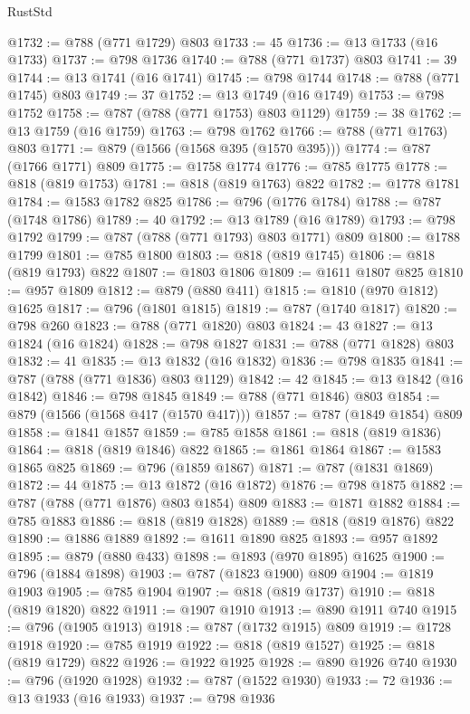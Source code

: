 \begin{lexlean}{RustStd}
\begin{coremodule}
@1732 := @788 (@771 @1729) @803
@1733 := 45
@1736 := @13 @1733 (@16 @1733)
@1737 := @798 @1736
@1740 := @788 (@771 @1737) @803
@1741 := 39
@1744 := @13 @1741 (@16 @1741)
@1745 := @798 @1744
@1748 := @788 (@771 @1745) @803
@1749 := 37
@1752 := @13 @1749 (@16 @1749)
@1753 := @798 @1752
@1758 := @787 (@788 (@771 @1753) @803 @1129)
@1759 := 38
@1762 := @13 @1759 (@16 @1759)
@1763 := @798 @1762
@1766 := @788 (@771 @1763) @803
@1771 := @879 (@1566 (@1568 @395 (@1570 @395)))
@1774 := @787 (@1766 @1771) @809
@1775 := @1758 @1774
@1776 := @785 @1775
@1778 := @818 (@819 @1753)
@1781 := @818 (@819 @1763) @822
@1782 := @1778 @1781
@1784 := @1583 @1782 @825
@1786 := @796 (@1776 @1784)
@1788 := @787 (@1748 @1786)
@1789 := 40
@1792 := @13 @1789 (@16 @1789)
@1793 := @798 @1792
@1799 := @787 (@788 (@771 @1793) @803 @1771) @809
@1800 := @1788 @1799
@1801 := @785 @1800
@1803 := @818 (@819 @1745)
@1806 := @818 (@819 @1793) @822
@1807 := @1803 @1806
@1809 := @1611 @1807 @825
@1810 := @957 @1809
@1812 := @879 (@880 @411)
@1815 := @1810 (@970 @1812) @1625
@1817 := @796 (@1801 @1815)
@1819 := @787 (@1740 @1817)
@1820 := @798 @260
@1823 := @788 (@771 @1820) @803
@1824 := 43
@1827 := @13 @1824 (@16 @1824)
@1828 := @798 @1827
@1831 := @788 (@771 @1828) @803
@1832 := 41
@1835 := @13 @1832 (@16 @1832)
@1836 := @798 @1835
@1841 := @787 (@788 (@771 @1836) @803 @1129)
@1842 := 42
@1845 := @13 @1842 (@16 @1842)
@1846 := @798 @1845
@1849 := @788 (@771 @1846) @803
@1854 := @879 (@1566 (@1568 @417 (@1570 @417)))
@1857 := @787 (@1849 @1854) @809
@1858 := @1841 @1857
@1859 := @785 @1858
@1861 := @818 (@819 @1836)
@1864 := @818 (@819 @1846) @822
@1865 := @1861 @1864
@1867 := @1583 @1865 @825
@1869 := @796 (@1859 @1867)
@1871 := @787 (@1831 @1869)
@1872 := 44
@1875 := @13 @1872 (@16 @1872)
@1876 := @798 @1875
@1882 := @787 (@788 (@771 @1876) @803 @1854) @809
@1883 := @1871 @1882
@1884 := @785 @1883
@1886 := @818 (@819 @1828)
@1889 := @818 (@819 @1876) @822
@1890 := @1886 @1889
@1892 := @1611 @1890 @825
@1893 := @957 @1892
@1895 := @879 (@880 @433)
@1898 := @1893 (@970 @1895) @1625
@1900 := @796 (@1884 @1898)
@1903 := @787 (@1823 @1900) @809
@1904 := @1819 @1903
@1905 := @785 @1904
@1907 := @818 (@819 @1737)
@1910 := @818 (@819 @1820) @822
@1911 := @1907 @1910
@1913 := @890 @1911 @740
@1915 := @796 (@1905 @1913)
@1918 := @787 (@1732 @1915) @809
@1919 := @1728 @1918
@1920 := @785 @1919
@1922 := @818 (@819 @1527)
@1925 := @818 (@819 @1729) @822
@1926 := @1922 @1925
@1928 := @890 @1926 @740
@1930 := @796 (@1920 @1928)
@1932 := @787 (@1522 @1930)
@1933 := 72
@1936 := @13 @1933 (@16 @1933)
@1937 := @798 @1936

\end{coremodule}
\end{lexlean}
